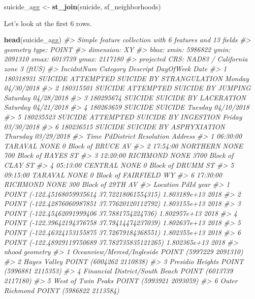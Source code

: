 \documentclass[
  12pt,
]{book}
\newenvironment{Shaded}{\begin{snugshade}}{\end{snugshade}}
\newcommand{\CommentTok}[1]{\textcolor[rgb]{0.37,0.37,0.37}{\textit{#1}}}
\newcommand{\KeywordTok}[1]{\textcolor[rgb]{0.27,0.27,0.27}{\textbf{#1}}}
\newcommand{\NormalTok}[1]{#1}
\newcommand{\StringTok}[1]{\textcolor[rgb]{0.5,0.5,0.5}{#1}}
\begin{document}
\begin{Shaded}
\begin{Highlighting}[]
\NormalTok{suicide\_agg <{-}}\StringTok{ }\KeywordTok{st\_join}\NormalTok{(suicide, sf\_neighborhoods)}
\end{Highlighting}
\end{Shaded}

Let's look at the first 6 rows.

\begin{Shaded}
\begin{Highlighting}[]
\KeywordTok{head}\NormalTok{(suicide\_agg)}
\CommentTok{\#> Simple feature collection with 6 features and 13 fields}
\CommentTok{\#> geometry type:  POINT}
\CommentTok{\#> dimension:      XY}
\CommentTok{\#> bbox:           xmin: 5986822 ymin: 2091310 xmax: 6013739 ymax: 2117180}
\CommentTok{\#> projected CRS:  NAD83 / California zone 3 (ftUS)}
\CommentTok{\#>   IncidntNum Category                           Descript DayOfWeek       Date}
\CommentTok{\#> 1  180318931  SUICIDE ATTEMPTED SUICIDE BY STRANGULATION    Monday 04/30/2018}
\CommentTok{\#> 2  180315501  SUICIDE       ATTEMPTED SUICIDE BY JUMPING  Saturday 04/28/2018}
\CommentTok{\#> 3  180295674  SUICIDE              SUICIDE BY LACERATION  Saturday 04/21/2018}
\CommentTok{\#> 4  180263659  SUICIDE                            SUICIDE   Tuesday 04/10/2018}
\CommentTok{\#> 5  180235523  SUICIDE     ATTEMPTED SUICIDE BY INGESTION    Friday 03/30/2018}
\CommentTok{\#> 6  180236515  SUICIDE            SUICIDE BY ASPHYXIATION  Thursday 03/29/2018}
\CommentTok{\#>       Time PdDistrict Resolution                 Address}
\CommentTok{\#> 1 06:30:00    TARAVAL       NONE     0 Block of BRUCE AV}
\CommentTok{\#> 2 17:54:00   NORTHERN       NONE   700 Block of HAYES ST}
\CommentTok{\#> 3 12:20:00   RICHMOND       NONE   3700 Block of CLAY ST}
\CommentTok{\#> 4 05:13:00    CENTRAL       NONE     0 Block of DRUMM ST}
\CommentTok{\#> 5 09:15:00    TARAVAL       NONE 0 Block of FAIRFIELD WY}
\CommentTok{\#> 6 17:30:00   RICHMOND       NONE    300 Block of 29TH AV}
\CommentTok{\#>                                         Location         PdId year}
\CommentTok{\#> 1  POINT ({-}122.45168059935614 37.72218061554315) 1.803189e+13 2018}
\CommentTok{\#> 2  POINT ({-}122.42876060987851 37.77620120112792) 1.803155e+13 2018}
\CommentTok{\#> 3   POINT ({-}122.45462091999406 37.7881754224736) 1.802957e+13 2018}
\CommentTok{\#> 4  POINT ({-}122.39642194376758 37.79414474237039) 1.802637e+13 2018}
\CommentTok{\#> 5  POINT ({-}122.46324153155875 37.72679184368551) 1.802355e+13 2018}
\CommentTok{\#> 6 POINT ({-}122.48929119750689 37.782735835121265) 1.802365e+13 2018}
\CommentTok{\#>                            nhood                geometry}
\CommentTok{\#> 1     Oceanview/Merced/Ingleside POINT (5997229 2091310)}
\CommentTok{\#> 2                   Hayes Valley POINT (6004262 2110838)}
\CommentTok{\#> 3               Presidio Heights POINT (5996881 2115353)}
\CommentTok{\#> 4 Financial District/South Beach POINT (6013739 2117180)}
\CommentTok{\#> 5             West of Twin Peaks POINT (5993921 2093059)}
\CommentTok{\#> 6                 Outer Richmond POINT (5986822 2113584)}
\end{Highlighting}
\end{Shaded}
\end{document}
